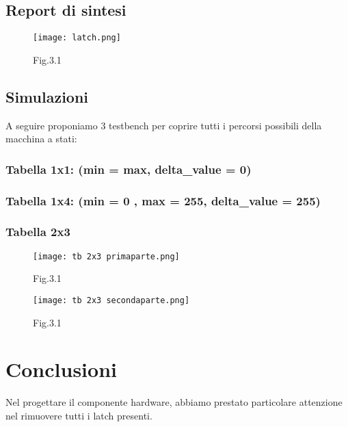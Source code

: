 \documentclass[12pt, table, xcdraw]{article}
\begin{document}
\subsection{Report di sintesi}
\begin{figure}[h!]
\begin{center}
  \texttt{[image: latch.png]}
\caption*{Fig.3.1}
\end{center}
\end{figure}
\FloatBarrier

\subsection{Simulazioni}
A seguire proponiamo 3 testbench per coprire tutti i percorsi possibili della macchina a stati:
\subsubsection{Tabella 1x1: (min = max, delta\_value = 0)}
\subsubsection{Tabella 1x4: (min = 0 , max = 255, delta\_value = 255)}
\subsubsection{Tabella 2x3}

\begin{figure}[h!]
\begin{center}
  \texttt{[image: tb 2x3 primaparte.png]}
\caption*{Fig.3.1}
  \texttt{[image: tb 2x3 secondaparte.png]}
\caption*{Fig.3.1}
\end{center}
\end{figure}
\FloatBarrier

\newpage
\section{Conclusioni}
Nel progettare il componente hardware, abbiamo prestato particolare attenzione nel rimuovere tutti i latch presenti.
\end{document}
